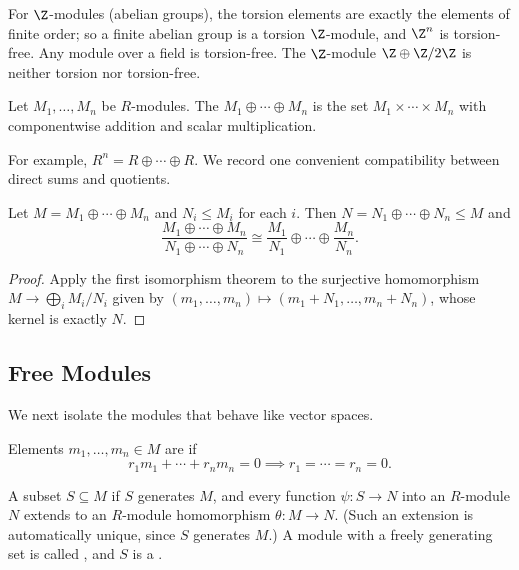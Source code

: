 \begin{example}
	For $\Z$-modules (abelian groups), the torsion elements are exactly the elements of finite order; so a finite abelian group is a torsion $\Z$-module, and $\Z^n$ is torsion-free. Any module over a field is torsion-free. The $\Z$-module $\Z \oplus \Z/2\Z$ is neither torsion nor torsion-free.
\end{example}

\begin{definition}
	Let $M_1, \dots, M_n$ be $R$-modules. The  $M_1 \oplus \cdots \oplus M_n$ is the set $M_1 \times \cdots \times M_n$ with componentwise addition and scalar multiplication.
\end{definition}

For example, $R^n = R \oplus \cdots \oplus R$. We record one convenient compatibility between direct sums and quotients.

\begin{lemma}
	Let $M = M_1 \oplus \cdots \oplus M_n$ and $N_i \leq M_i$ for each $i$. Then $N = N_1 \oplus \cdots \oplus N_n \leq M$ and
	$$
	\frac{M_1 \oplus \cdots \oplus M_n}{N_1 \oplus \cdots \oplus N_n} \cong \frac{M_1}{N_1} \oplus \cdots \oplus \frac{M_n}{N_n}.
	$$
\end{lemma}
\begin{proof}
	Apply the first isomorphism theorem to the surjective homomorphism $M \rightarrow \bigoplus_i M_i/N_i$ given by $(m_1, \dots, m_n) \mapsto (m_1 + N_1, \dots, m_n + N_n)$, whose kernel is exactly $N$.
\end{proof}

\subsection{Free Modules}

We next isolate the modules that behave like vector spaces.

\begin{definition}[Independence]
	Elements $m_1, \dots, m_n \in M$ are  if
	$$
	r_1 m_1 + \cdots + r_n m_n = 0 \implies r_1 = \cdots = r_n = 0.
	$$
\end{definition}

\begin{definition}
	A subset $S \subseteq M$  if $S$ generates $M$, and every function $\psi: S \rightarrow N$ into an $R$-module $N$ extends to an $R$-module homomorphism $\theta: M \rightarrow N$. (Such an extension is automatically unique, since $S$ generates $M$.) A module with a freely generating set is called , and $S$ is a .
\end{definition}

